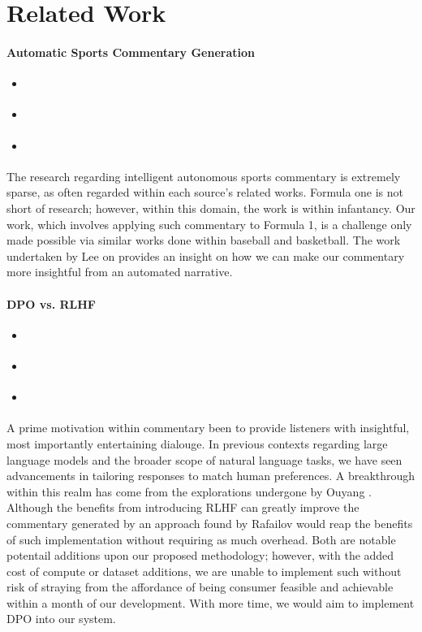 \section{Related Work}

\paragraph{Automatic Sports Commentary Generation}
\begin{itemize}
    \item \cite{AutoBaseComm}
    \item \cite{SCoReS}
    \item \cite{AutoBaskComm}
\end{itemize}
The research regarding intelligent autonomous sports commentary is extremely sparse, as often regarded within each source's related works. Formula one is not short of research; however, within this domain, the work is within infantancy. Our work, which involves applying such commentary to Formula 1, is a challenge only made possible via similar works done within baseball and basketball. The work undertaken by Lee on \cite{SCoReS} provides an insight on how we can make our commentary more insightful from an automated narrative. 
\paragraph{DPO vs. RLHF}
\begin{itemize}
    \item \cite{DPO}
    \item \cite{ouyang2022traininglanguagemodelsfollow}
    \item \cite{SFT}
\end{itemize}
A prime motivation within commentary been to provide listeners with insightful, most importantly entertaining dialouge. In previous contexts regarding large language models and the broader scope of natural language tasks, we have seen advancements in tailoring responses to match human preferences. A breakthrough within this realm has come from the explorations undergone by Ouyang \cite{ouyang2022traininglanguagemodelsfollow}. Although the benefits from introducing RLHF can greatly improve the commentary generated by an approach found by Rafailov \cite{DPO} would reap the benefits of such implementation without requiring as much overhead. Both are notable potentail additions upon our proposed methodology; however, with the added cost of compute or dataset additions, we are unable to implement such without risk of straying from the affordance of being consumer feasible and achievable within a month of our development. With more time, we would aim to implement DPO into our system.

